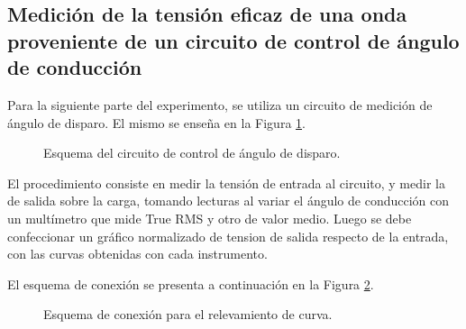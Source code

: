   \subsection{Medición de la tensión eficaz de una onda proveniente de un circuito de control de ángulo de conducción}
Para la siguiente parte del experimento, se utiliza un circuito de medición 
de ángulo de disparo. El mismo se enseña en la Figura \ref{fig:CircuitoTriac}.

\begin{figure}[H]
  \centering
  \caption{Esquema del circuito de control de ángulo de disparo.}
  \label{fig:CircuitoTriac}
\end{figure}

El procedimiento consiste en medir la tensión de entrada al circuito, 
y medir la de salida sobre la carga, tomando lecturas
al variar el ángulo de conducción con un multímetro que mide True RMS y otro de valor medio. 
Luego se debe confeccionar un gráfico normalizado de tension de salida 
respecto de la entrada, con las curvas obtenidas con cada instrumento.

El esquema de conexión se presenta a continuación en la Figura \ref{fig:EsquemaConexionTriac}.

\begin{figure}[H]
  \centering
  \caption{Esquema de conexión para el relevamiento de curva.}
  \label{fig:EsquemaConexionTriac}
\end{figure}


